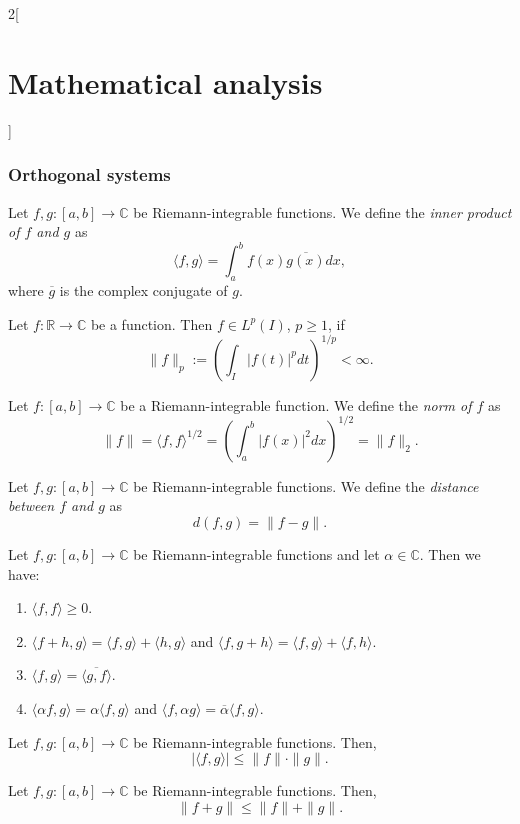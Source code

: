\documentclass[class=article,crop=false]{standalone}
\begin{document}
\begin{multicols}{2}[\section{Mathematical analysis}]
\subsubsection{Orthogonal systems}
\begin{definition}
Let $f,g:[a,b]\rightarrow\mathbb{C}$ be Riemann-integrable functions. We define the \textit{inner product of $f$ and $g$} as $$\langle f,g\rangle=\int_a^bf(x)\overline{g(x)}dx,$$ where $\overline{g}$ is the complex conjugate of $g$.
\end{definition}
\begin{definition}
Let $f:\mathbb{R}\rightarrow\mathbb{C}$ be a function. Then $f\in L^p(I)$, $p\geq1$, if $$\|f\|_p:=\left(\int_I|f(t)|^pdt\right)^{1/p}<\infty.$$ 
\end{definition}
\begin{definition}
Let $f:[a,b]\rightarrow\mathbb{C}$ be a Riemann-integrable function. We define the \textit{norm of $f$} as $$\|f\|=\langle f,f\rangle^{1/2}=\left(\int_a^b|f(x)|^2dx\right)^{1/2}=\|f\|_2.$$
\end{definition}
\begin{definition}
Let $f,g:[a,b]\rightarrow\mathbb{C}$ be Riemann-integrable functions. We define the \textit{distance between $f$ and $g$} as $$d(f,g)=\|f-g\|.$$
\end{definition}
\begin{prop}
Let $f,g:[a,b]\rightarrow\mathbb{C}$ be Riemann-integrable functions and let $\alpha\in\mathbb{C}$. Then we have:
\begin{enumerate}
    \item $\langle f,f\rangle\geq 0$.
    \item $\langle f+h,g\rangle=\langle f,g\rangle+\langle h,g\rangle$ and $\langle f,g+h\rangle=\langle f,g\rangle+\langle f,h\rangle$.
    \item $\langle f,g\rangle=\overline{\langle g,f\rangle}$.
    \item $\langle \alpha f,g\rangle=\alpha\langle f,g\rangle$ and $\langle f,\alpha g\rangle=\overline{\alpha}\langle f,g\rangle$.
\end{enumerate}
\end{prop}
\begin{theorem}
Let $f,g:[a,b]\rightarrow\mathbb{C}$ be Riemann-integrable functions. Then, $$|\langle f,g\rangle|\leq\|f\|\cdot\|g\|.$$
\end{theorem}
\begin{theorem}
Let $f,g:[a,b]\rightarrow\mathbb{C}$ be Riemann-integrable functions. Then, $$\| f+g\|\leq\|f\|+\|g\|.$$

\end{theorem}
\end{multicols}
\end{document}
